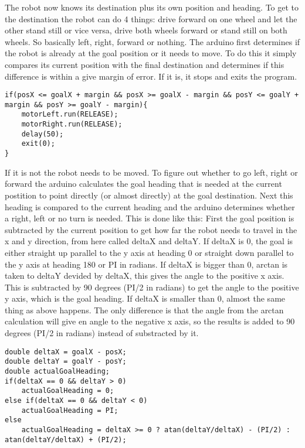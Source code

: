 The robot now knows its destination plus its own position and heading. To get to the destination the robot can do 4 things: drive forward on one wheel and let the other stand still or vice versa, drive both wheels forward or stand still on both wheels. So basically left, right, forward or nothing. The arduino first determines if the robot is already at the goal position or it needs to move. To do this it simply compares its current position with the final destination and determines if this difference is within a give margin of error. If it is, it stops and exits the program.

\begin{lstlisting}[caption={If-statement to check if the robot should stop}, label={lst:stopplz}]
if(posX <= goalX + margin && posX >= goalX - margin && posY <= goalY + margin && posY >= goalY - margin){
	motorLeft.run(RELEASE);
	motorRight.run(RELEASE);
	delay(50);
	exit(0);
} 
\end{lstlisting}

If it is not the robot needs to be moved. To figure out whether to go left, right or forward the arduino calculates the goal heading that is needed at the current postition to point directly (or almost directly) at the goal destination. Next this heading is compared to the current heading and the arduino determines whether a right, left or no turn is needed. This is done like this:
First the goal position is subtracted by the current position to get how far the robot needs to travel in the x and y direction, from here called deltaX and deltaY. \newline
If deltaX is 0, the goal is either straight up parallel to the y axis at heading 0 or straight down parallel to the y axis at heading 180 or PI in radians. \newline
If deltaX is bigger than 0, arctan is taken to deltaY devided by deltaX, this gives the angle to the positive x axis. This is subtracted by 90 degrees (PI/2 in radians) to get the angle to the positive y axis, which is the goal heading. \newline
If deltaX is smaller than 0, almost the same thing as above happens. The only difference is that the angle from the arctan calculation will give en angle to the negative x axis, so the results is added to 90 degrees (PI/2 in radians) instead of substracted by it.

\begin{lstlisting}[caption={Part of the driveTowardsGoal function to calculate the goalHeading}, label={lst:calcGH}]
double deltaX = goalX - posX;
double deltaY = goalY - posY;
double actualGoalHeading;
if(deltaX == 0 && deltaY > 0)
	actualGoalHeading = 0;
else if(deltaX == 0 && deltaY < 0)
	actualGoalHeading = PI;
else
	actualGoalHeading = deltaX >= 0 ? atan(deltaY/deltaX) - (PI/2) : atan(deltaY/deltaX) + (PI/2);
\end{lstlisting}


